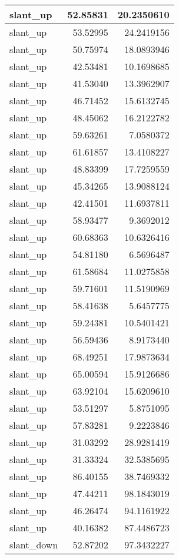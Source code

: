 \documentclass[
]{book}
\theoremstyle{definition}
\theoremstyle{definition}
\theoremstyle{definition}
\theoremstyle{definition}
\theoremstyle{remark}
\begin{document}
\begin{tabular}{l|r|r}
\hline
slant\_up & 52.85831 & 20.2350610\\
\hline
slant\_up & 53.52995 & 24.2419156\\
\hline
slant\_up & 50.75974 & 18.0893946\\
\hline
slant\_up & 42.53481 & 10.1698685\\
\hline
slant\_up & 41.53040 & 13.3962907\\
\hline
slant\_up & 46.71452 & 15.6132745\\
\hline
slant\_up & 48.45062 & 16.2122782\\
\hline
slant\_up & 59.63261 & 7.0580372\\
\hline
slant\_up & 61.61857 & 13.4108227\\
\hline
slant\_up & 48.83399 & 17.7259559\\
\hline
slant\_up & 45.34265 & 13.9088124\\
\hline
slant\_up & 42.41501 & 11.6937811\\
\hline
slant\_up & 58.93477 & 9.3692012\\
\hline
slant\_up & 60.68363 & 10.6326416\\
\hline
slant\_up & 54.81180 & 6.5696487\\
\hline
slant\_up & 61.58684 & 11.0275858\\
\hline
slant\_up & 59.71601 & 11.5190969\\
\hline
slant\_up & 58.41638 & 5.6457775\\
\hline
slant\_up & 59.24381 & 10.5401421\\
\hline
slant\_up & 56.59436 & 8.9173440\\
\hline
slant\_up & 68.49251 & 17.9873634\\
\hline
slant\_up & 65.00594 & 15.9126686\\
\hline
slant\_up & 63.92104 & 15.6209610\\
\hline
slant\_up & 53.51297 & 5.8751095\\
\hline
slant\_up & 57.83281 & 9.2223846\\
\hline
slant\_up & 31.03292 & 28.9281419\\
\hline
slant\_up & 31.33324 & 32.5385695\\
\hline
slant\_up & 86.40155 & 38.7469332\\
\hline
slant\_up & 47.44211 & 98.1843019\\
\hline
slant\_up & 46.26474 & 94.1161922\\
\hline
slant\_up & 40.16382 & 87.4486723\\
\hline
slant\_down & 52.87202 & 97.3432227\\

\end{tabular}
\end{document}
